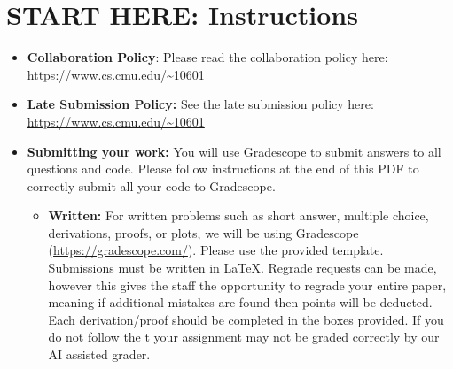 \documentclass[11pt,addpoints,answers]{exam}
\begin{document}
\section*{START HERE: Instructions}
\begin{itemize}

\item \textbf{Collaboration Policy}: Please read the collaboration policy here: \url{https://www.cs.cmu.edu/~10601}

\item\textbf{Late Submission Policy:} See the late submission policy here: \url{https://www.cs.cmu.edu/~10601}

\item\textbf{Submitting your work:} You will use Gradescope to submit
  answers to all questions and code. Please
  follow instructions at the end of this PDF to correctly submit all your code to Gradescope.

  \begin{itemize}
    

    
   \item \textbf{Written:} For written problems such as short answer, multiple choice, derivations, proofs, or plots, we will be using Gradescope (\url{https://gradescope.com/}). Please use the provided template. Submissions must be written in LaTeX. Regrade requests can be made, however this gives the staff the opportunity to regrade your entire paper, meaning if additional mistakes are found then points will be deducted.
   Each derivation/proof should be completed in the boxes provided. If you do not follow the t your assignment may not be graded correctly by our AI assisted grader.


\end{itemize}
\end{itemize}
\end{document}
